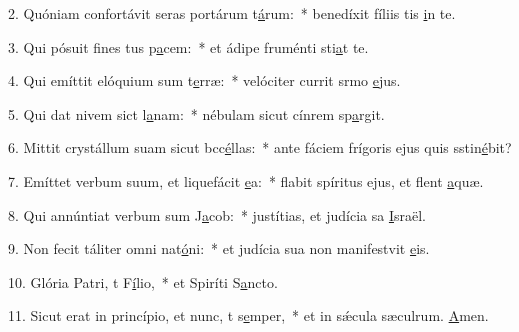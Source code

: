 2. Quóniam confortávit seras portárum t\uline{á}rum:~* benedíxit fíliis tis \uline{i}n te.\par 
3. Qui pósuit fines tus p\uline{a}cem:~* et ádipe fruménti sti\uline{a}t te.\par 
4. Qui emíttit elóquium sum t\uline{e}rræ:~* velóciter currit srmo \uline{e}jus.\par 
5. Qui dat nivem sict l\uline{a}nam:~* nébulam sicut cínrem sp\uline{a}rgit.\par 
6. Mittit crystállum suam sicut bcc\uline{é}llas:~* ante fáciem frígoris ejus quis sstin\uline{é}bit?\par 
7. Emíttet verbum suum, et liquefácit \uline{e}a:~* flabit spíritus ejus, et flent \uline{a}quæ.\par 
8. Qui annúntiat verbum sum J\uline{a}cob:~* justítias, et judícia sa \uline{I}sraël.\par 
9. Non fecit táliter omni nat\uline{ó}ni:~* et judícia sua non manifestvit \uline{e}is.\par 
10. Glória Patri, t F\uline{í}lio,~* et Spiríti S\uline{a}ncto.\par 
11. Sicut erat in princípio, et nunc, t s\uline{e}mper,~* et in sǽcula sæculrum. \uline{A}men.\par 
